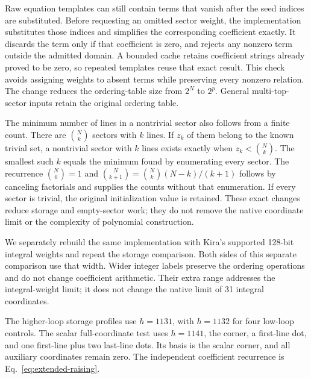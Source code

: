 Raw equation templates can still contain terms that vanish after the seed indices are substituted. Before requesting an omitted sector weight, the implementation substitutes those indices and simplifies the corresponding coefficient exactly. It discards the term only if that coefficient is zero, and rejects any nonzero term outside the admitted domain. A bounded cache retains coefficient strings already proved to be zero, so repeated templates reuse that exact result. This check avoids assigning weights to absent terms while preserving every nonzero relation. The change reduces the ordering-table size from $2^N$ to $2^p$. General multi-top-sector inputs retain the original ordering table.

The minimum number of lines in a nontrivial sector also follows from a finite count. There are $\binom{N}{k}$ sectors with $k$ lines. If $z_k$ of them belong to the known trivial set, a nontrivial sector with $k$ lines exists exactly when $z_k<\binom{N}{k}$. The smallest such $k$ equals the minimum found by enumerating every sector. The recurrence $\binom{N}{0}=1$ and $\binom{N}{k+1}=\binom{N}{k}(N-k)/(k+1)$ follows by canceling factorials and supplies the counts without that enumeration. If every sector is trivial, the original initialization value is retained. These exact changes reduce storage and empty-sector work; they do not remove the native coordinate limit or the complexity of polynomial construction.

We separately rebuild the same implementation with Kira's supported 128-bit integral weights and repeat the storage comparison. Both sides of this separate comparison use that width. Wider integer labels preserve the ordering operations and do not change coefficient arithmetic. Their extra range addresses the integral-weight limit; it does not change the native limit of 31 integral coordinates.

The higher-loop storage profiles use $h=1131$, with $h=1132$ for four low-loop controls. The scalar full-coordinate test uses $h=1141$, the corner, a first-line dot, and one first-line plus two last-line dots. Its basis is the scalar corner, and all auxiliary coordinates remain zero. The independent coefficient recurrence is Eq.~\eqref{eq:extended-raising}.
